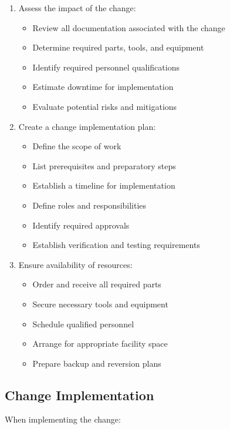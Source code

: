 \documentclass[12pt,a4paper,twoside,openright]{book}
\begin{document}
\begin{enumerate}
    \item Assess the impact of the change:
    \begin{itemize}
        \item Review all documentation associated with the change
        \item Determine required parts, tools, and equipment
        \item Identify required personnel qualifications
        \item Estimate downtime for implementation
        \item Evaluate potential risks and mitigations
    \end{itemize}
    
    \item Create a change implementation plan:
    \begin{itemize}
        \item Define the scope of work
        \item List prerequisites and preparatory steps
        \item Establish a timeline for implementation
        \item Define roles and responsibilities
        \item Identify required approvals
        \item Establish verification and testing requirements
    \end{itemize}
    
    \item Ensure availability of resources:
    \begin{itemize}
        \item Order and receive all required parts
        \item Secure necessary tools and equipment
        \item Schedule qualified personnel
        \item Arrange for appropriate facility space
        \item Prepare backup and reversion plans
    \end{itemize}
\end{enumerate}

\subsection{Change Implementation}

When implementing the change:
\end{document}
